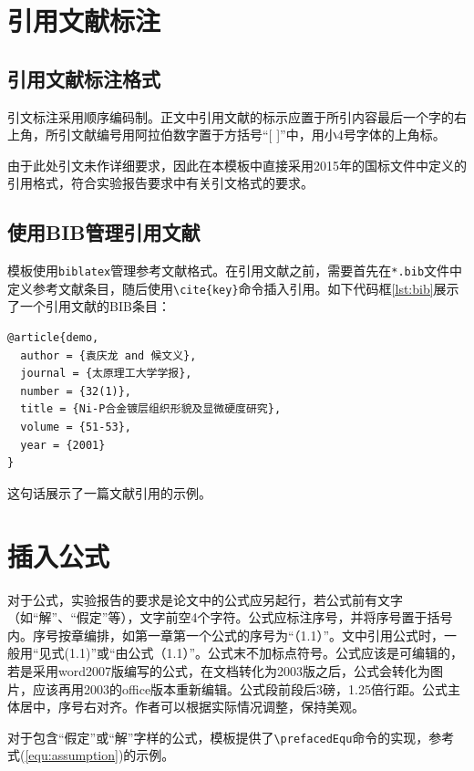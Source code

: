 \section{引用文献标注}

\subsection{引用文献标注格式}

引文标注采用顺序编码制。正文中引用文献的标示应置于所引内容最后一个字的右上角，所引文献编号用阿拉伯数字置于方括号“[ ]”中，用小4号字体的上角标。

由于此处引文未作详细要求，因此在本模板中直接采用2015年的国标文件中定义的引用格式，符合实验报告要求中有关引文格式的要求。

\subsection{使用BIB管理引用文献}

模板使用\texttt{biblatex}管理参考文献格式。在引用文献之前，需要首先在\texttt{*.bib}文件中定义参考文献条目，随后使用\texttt{\textbackslash cite\{key\}}命令插入引用。如下代码框\ref{lst:bib}展示了一个引用文献的BIB条目：

\begin{lstlisting}[caption={BIB引文格式条目示例\label{lst:bib}}]
@article{demo,
  author = {袁庆龙 and 候文义},
  journal = {太原理工大学学报},
  number = {32(1)},
  title = {Ni-P合金镀层组织形貌及显微硬度研究},
  volume = {51-53},
  year = {2001}
}
\end{lstlisting}

这句话展示了一篇文献引用的示例\cite{demo}。

\section{插入公式}

对于公式，实验报告的要求是论文中的公式应另起行，若公式前有文字（如“解”、“假定”等），文字前空4个字符。公式应标注序号，并将序号置于括号内。序号按章编排，如第一章第一个公式的序号为“（1.1）”。文中引用公式时，一般用“见式(1.1)”或“由公式（1.1）”。公式末不加标点符号。公式应该是可编辑的，若是采用word2007版编写的公式，在文档转化为2003版之后，公式会转化为图片，应该再用2003的office版本重新编辑。公式段前段后3磅，1.25倍行距。公式主体居中，序号右对齐。作者可以根据实际情况调整，保持美观。

对于包含“假定”或“解”字样的公式，模板提供了\texttt{\textbackslash prefacedEqu}命令的实现，参考式(\ref{equ:assumption})的示例。

